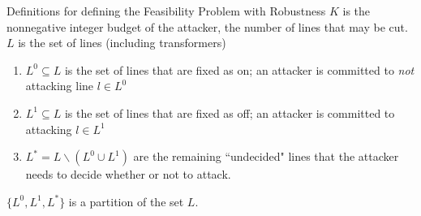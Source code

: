 \documentclass[xcolor=dvipsnames]{beamer}
\begin{document}
\begin{frame}{Definitions for defining the Feasibility Problem with Robustness}
$K$ is the nonnegative integer budget of the attacker, the number of lines that may be cut.
$L$ is the set of lines (including transformers)
\begin{enumerate}
\item $L^0 \subseteq L$ is the set of lines that are fixed as on; an attacker is committed to \emph{not} attacking line $l \in L^0$
\item $L^1 \subseteq L$ is the set of lines that are fixed as off; an attacker is committed to attacking $l \in L^1$
\item $L^* = L \backslash (L^0 \cup L^1)$ are the remaining ``undecided" lines that the attacker needs to decide whether or not to attack.
\end{enumerate}
$\{ L^0, L^1, L^*\}$ is a partition of the set $L$.
\end{frame}
\end{document}
